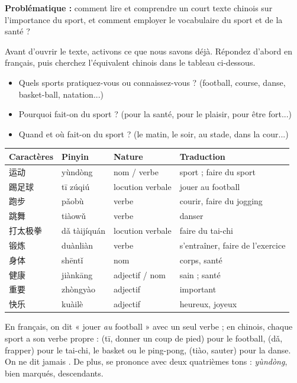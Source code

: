 \documentclass[11pt]{article}
\newcommand{\zh}[1]{\ifmmode\text{#1}\else{#1}\fi}
\begin{document}
\textbf{Problématique :} comment lire et comprendre un court texte chinois sur l'importance du sport, et comment employer le vocabulaire du sport et de la santé ?

Avant d'ouvrir le texte, activons ce que nous savons déjà. Répondez d'abord en français, puis cherchez l'équivalent chinois dans le tableau ci-dessous.

\begin{itemize}
\item Quels sports pratiquez-vous ou connaissez-vous ? (football, course, danse, basket-ball, natation...)
\item Pourquoi fait-on du sport ? (pour la santé, pour le plaisir, pour être fort...)
\item Quand et où fait-on du sport ? (le matin, le soir, au stade, dans la cour...)
\end{itemize}

\begin{center}
\begin{tabularx}{\linewidth}{|X|X|X|X|}
\hline
\rowcolor{popblueL} Caractères & Pinyin & Nature & Traduction \\
\hline
运动 & yùndòng & nom / verbe & sport ; faire du sport \\
\hline
踢足球 & tī zúqiú & locution verbale & jouer au football \\
\hline
跑步 & pǎobù & verbe & courir, faire du jogging \\
\hline
跳舞 & tiàowǔ & verbe & danser \\
\hline
打太极拳 & dǎ tàijíquán & locution verbale & faire du tai-chi \\
\hline
锻炼 & duànliàn & verbe & s'entraîner, faire de l'exercice \\
\hline
身体 & shēntǐ & nom & corps, santé \\
\hline
健康 & jiànkāng & adjectif / nom & sain ; santé \\
\hline
重要 & zhòngyào & adjectif & important \\
\hline
快乐 & kuàilè & adjectif & heureux, joyeux \\
\hline
\end{tabularx}
\end{center}

\begin{attention}
En français, on dit « jouer \emph{au} football » avec un seul verbe ; en chinois, chaque sport a son verbe propre : \zh{踢} (tī, donner un coup de pied) pour le football, \zh{打} (dǎ, frapper) pour le tai-chi, le basket ou le ping-pong, \zh{跳} (tiào, sauter) pour la danse. On ne dit jamais \zh{玩足球}. De plus, \zh{运动} se prononce avec deux quatrièmes tons : \emph{yùndòng}, bien marqués, descendants.
\end{attention}
\end{document}
